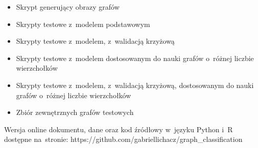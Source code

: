 
\begin{itemize}[label=-,labelsep=0.4cm,leftmargin=0.6cm]
    \item Skrypt generujący obrazy grafów
    \item Skrypty testowe z~modelem podstawowym
    \item Skrypty testowe z~modelem, z~walidacją krzyżową
    \item Skrypty testowe z~modelem dostosowanym do nauki grafów o~różnej liczbie wierzchołków
    \item Skrypty testowe z~modelem, z~walidacją krzyżową, dostosowanym do nauki grafów o~różnej liczbie wierzchołków
    \item Zbiór zewnętrznych grafów testowych
\end{itemize}

\vspace*{\fill}

Wersja online dokumentu, dane oraz kod źródłowy w~języku Python i~R dostępne na~stronie:
https://github.com/gabriellichacz/graph\_classification